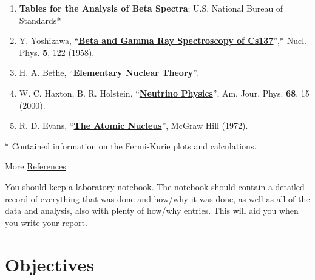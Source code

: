 \documentclass{../lab}
\begin{document}
\begin{enumerate}
    \item \textbf{Tables for the Analysis of Beta Spectra}; U.S. National Bureau of Standards*

    \item Y. Yoshizawa, ``\href{https://www.sciencedirect.com/science/article/pii/0029558258900117?via%3Dihub}{\textbf{Beta and Gamma Ray Spectroscopy of Cs137}}'',* Nucl. Phys. \textbf{5}, 122 (1958).

    \item H. A. Bethe, ``\textbf{Elementary Nuclear Theory}''.

    \item W. C. Haxton, B. R. Holstein, ``\href{https://arxiv.org/pdf/hep-ph/9905257}{\textbf{Neutrino Physics}}'', Am. Jour. Phys. \textbf{68}, 15 (2000).

    \item R. D. Evans, ``\href{https://library.psfc.mit.edu/catalog/online_pubs/books/evans_atomic_nucleus.pdf
    }{\textbf{The Atomic Nucleus}}'', McGraw Hill (1972).

\end{enumerate}

* Contained information on the Fermi-Kurie plots and calculations.

More \hyperref[sec:References]{References}

You should keep a laboratory notebook. The notebook should contain a detailed record of everything that was done and how/why it was done, as well as all of the data and analysis, also with plenty of how/why entries. This will aid you when you write your report.

\section{Objectives}

\end{document}
